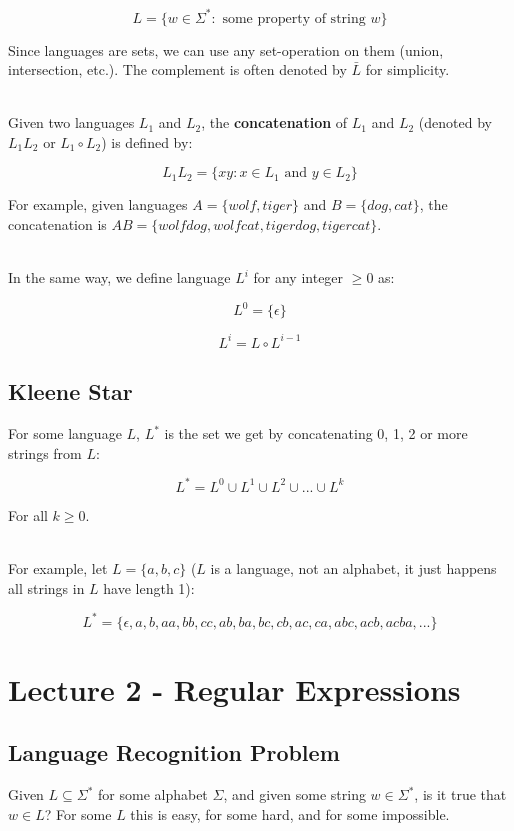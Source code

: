\documentclass[12pt]{article}
\begin{document}
\[ L = \{ w \in \Sigma^* : \text{ some property of string } w \} \]

\noindent
Since languages are sets, we can use any set-operation on them (union, intersection, etc.).
The complement is often denoted by $\bar{L}$ for simplicity.

\noindent
\\
Given two languages $L_1$ and $L_2$, the \textbf{concatenation} of $L_1$ and $L_2$ (denoted by $L_1 L_2$ or $L_1 \circ L_2$) is defined by:

\[ L_1 L_2 = \{ xy : x \in L_1 \text{ and } y \in L_2 \} \]

\noindent
For example, given languages $A = \{ wolf, tiger \}$ and $B = \{ dog, cat \}$, the concatenation is $AB = \{ wolfdog, wolfcat, tigerdog, tigercat \}$.

\noindent
\\
In the same way, we define language $L^i$ for any integer $\geq 0$ as:

\[ L^0 = \{ \epsilon \} \]

\[ L^i = L \circ L^{i - 1} \]

\newpage
\subsection*{Kleene Star}
For some language $L$, $L^*$ is the set we get by concatenating 0, 1, 2 or more strings from $L$:

\[ L^* = L^0 \cup L^1 \cup L^2 \cup ... \cup L^k  \]

\noindent
For all $k \geq 0$.

\noindent
\\
For example, let $L = \{ a, b, c \}$ ($L$ is a language, not an alphabet, it just happens all strings in $L$ have length 1):

\[ L^* = \{ \epsilon, a, b, aa, bb, cc, ab, ba, bc, cb, ac, ca, abc, acb, acba, ... \} \]

%
%
\section*{Lecture 2 - Regular Expressions}
\subsection*{Language Recognition Problem}
Given $L \subseteq \Sigma^*$ for some alphabet $\Sigma$, and given some string $w \in \Sigma^*$, is it true that $w \in L$?
For some $L$ this is easy, for some hard, and for some impossible.
\end{document}
